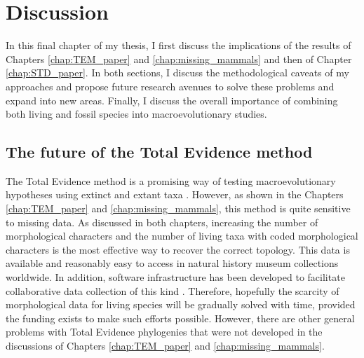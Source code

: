 \chapter{Discussion}
\label{chap:discussion}

%
%

In this final chapter of my thesis, I first discuss the implications of the results of Chapters \ref{chap:TEM_paper} and \ref{chap:missing_mammals} and then of Chapter \ref{chap:STD_paper}.
In both sections, I discuss the methodological caveats of my approaches and propose future research avenues to solve these problems and expand into new areas.
Finally, I discuss the overall importance of combining both living and fossil species into macroevolutionary studies.

\section{The future of the Total Evidence method}
The Total Evidence method is a promising way of testing macroevolutionary hypotheses using extinct and extant taxa \citep[e.g.][]{ronquista2012,Slater2012MEE,Wood01032013,beckancient2014,Dembo2015}.
However, as shown in the Chapters \ref{chap:TEM_paper} and \ref{chap:missing_mammals}, this method is quite sensitive to missing data.
As discussed in both chapters, increasing the number of morphological characters and the number of living taxa with coded morphological characters is the most effective way to recover the correct topology.
This data is available and reasonably easy to access in natural history museum collections worldwide. 
In addition, software infrastructure has been developed to facilitate collaborative data collection of this kind \citep{morphobank}.
Therefore, hopefully the scarcity of morphological data for living species will be gradually solved with time, provided the funding exists to make such efforts possible.
However, there are other general problems with Total Evidence phylogenies that were not developed in the discussions of Chapters \ref{chap:TEM_paper} and \ref{chap:missing_mammals}. 

